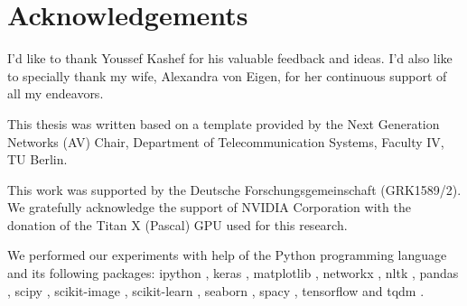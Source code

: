 \documentclass[bibtotoc,liststotoc,BCOR5mm,DIV12s]{standalone}
\begin{document}
\section{Acknowledgements}
I'd like to thank Youssef Kashef for his valuable feedback and ideas. I'd also like to specially thank my wife, Alexandra von Eigen, for her continuous support of all my endeavors.

This thesis was written based on a template provided by the Next Generation Networks (AV) Chair, Department of Telecommunication Systems, Faculty IV, TU Berlin.

This work was supported by the Deutsche Forschungsgemeinschaft (GRK1589/2). We gratefully acknowledge the support of NVIDIA Corporation with the donation of the Titan X (Pascal) GPU used for this research.

We performed our experiments with help of the Python programming language \cite{python} and its following packages: ipython \cite{ipython}, keras \cite{keras}, matplotlib \cite{matplotlib}, networkx \cite{networkx}, nltk \cite{nltk}, pandas \cite{pandas}, scipy \cite{scipy}, scikit-image \cite{scikitimage}, scikit-learn \cite{scikitlearn}, seaborn \cite{seaborn}, spacy \cite{spacy}, tensorflow \cite{tensorflow} and tqdm \cite{tqdm}.
\end{document}
